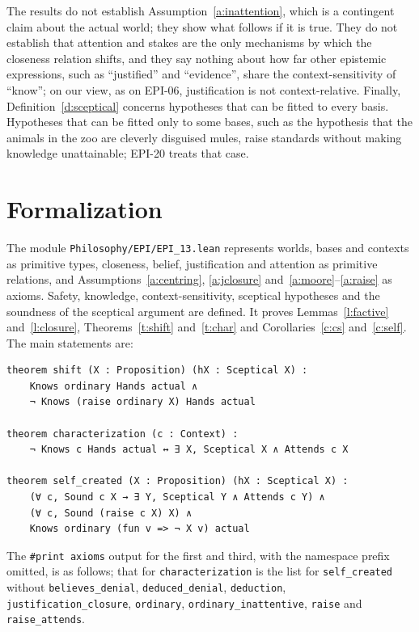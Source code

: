 \documentclass{situationist-preprint}
\begin{document}
The results do not establish Assumption~\ref{a:inattention}, which is a contingent claim about the actual world; they show what follows if it is true. They do not establish that attention and stakes are the only mechanisms by which the closeness relation shifts, and they say nothing about how far other epistemic expressions, such as \enquote{justified} and \enquote{evidence}, share the context-sensitivity of \enquote{know}; on our view, as on EPI-06, justification is not context-relative. Finally, Definition~\ref{d:sceptical} concerns hypotheses that can be fitted to every basis. Hypotheses that can be fitted only to some bases, such as the hypothesis that the animals in the zoo are cleverly disguised mules, raise standards without making knowledge unattainable; EPI-20 treats that case.

\section{Formalization}

The module \nolinkurl{Philosophy/EPI/EPI_13.lean} represents worlds, bases and contexts as primitive types, closeness, belief, justification and attention as primitive relations, and Assumptions~\ref{a:centring}, \ref{a:jclosure} and~\ref{a:moore}--\ref{a:raise} as axioms. Safety, knowledge, context-sensitivity, sceptical hypotheses and the soundness of the sceptical argument are defined. It proves Lemmas~\ref{l:factive} and~\ref{l:closure}, Theorems~\ref{t:shift} and~\ref{t:char} and Corollaries~\ref{c:cs} and~\ref{c:self}. The main statements are:

\begin{lstlisting}
theorem shift (X : Proposition) (hX : Sceptical X) :
    Knows ordinary Hands actual ∧
    ¬ Knows (raise ordinary X) Hands actual

theorem characterization (c : Context) :
    ¬ Knows c Hands actual ↔ ∃ X, Sceptical X ∧ Attends c X

theorem self_created (X : Proposition) (hX : Sceptical X) :
    (∀ c, Sound c X → ∃ Y, Sceptical Y ∧ Attends c Y) ∧
    (∀ c, Sound (raise c X) X) ∧
    Knows ordinary (fun v => ¬ X v) actual
\end{lstlisting}

\begin{sloppypar}
The \texttt{\#print axioms} output for the first and third, with the namespace prefix omitted, is as follows; that for \texttt{characterization} is the list for \texttt{self\_created} without \texttt{believes\_denial}, \texttt{deduced\_denial}, \texttt{deduction}, \texttt{justification\_closure}, \texttt{ordinary}, \texttt{ordinary\_inattentive}, \texttt{raise} and \texttt{raise\_attends}.
\end{sloppypar}
\end{document}
